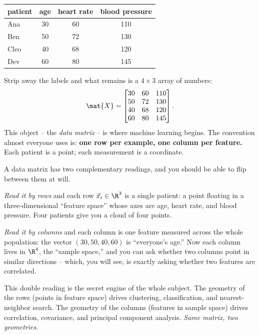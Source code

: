 \begin{center}
\begin{tabular}{lccc}
\toprule
patient & age & heart rate & blood pressure \\
\midrule
Ana   & 30 & 60 & 110 \\
Ben   & 50 & 72 & 130 \\
Cleo  & 40 & 68 & 120 \\
Dev   & 60 & 80 & 145 \\
\bottomrule
\end{tabular}
\end{center}

Strip away the labels and what remains is a $4\times 3$ array of numbers:
\[
\mat{X} =
\begin{bmatrix}
30 & 60 & 110 \\
50 & 72 & 130 \\
40 & 68 & 120 \\
60 & 80 & 145
\end{bmatrix}.
\]
This object -- the \emph{data matrix} -- is where machine learning begins. The
convention almost everyone uses is: \textbf{one row per example, one column per
feature.} Each patient is a point; each measurement is a coordinate.

\begin{intuitionbox}
A data matrix has two complementary readings, and you should be able to flip between
them at will.

\emph{Read it by rows} and each row $\vec{x}_i \in \R^{3}$ is a single patient: a point
floating in a three-dimensional ``feature space'' whose axes are age, heart rate, and
blood pressure. Four patients give you a cloud of four points.

\emph{Read it by columns} and each column is one feature measured across the whole
population: the vector $(30,50,40,60)$ is ``everyone's age.'' Now each column lives in
$\R^{4}$, the ``sample space,'' and you can ask whether two columns point in similar
directions -- which, you will see, is exactly asking whether two features are
correlated.
\end{intuitionbox}

This double reading is the secret engine of the whole subject. The geometry of the rows
(points in feature space) drives clustering, classification, and nearest-neighbor
search. The geometry of the columns (features in sample space) drives correlation,
covariance, and principal component analysis. \emph{Same matrix, two geometries.}

